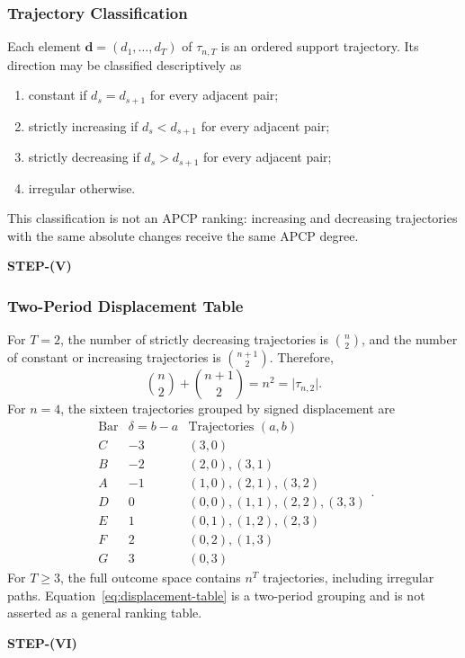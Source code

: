 \documentclass[conference]{IEEEtran}
\theoremstyle{plain}
\theoremstyle{definition}
\theoremstyle{remark}
\begin{document}
	\subsubsection{Trajectory Classification}
	Each element $\mathbf d=(d_1,\ldots,d_T)$ of $\tau_{n,T}$ is an ordered support trajectory. Its direction may be classified descriptively as
	\begin{enumerate}[label=(\roman*)]
		\item constant if $d_s=d_{s+1}$ for every adjacent pair;
		\item strictly increasing if $d_s<d_{s+1}$ for every adjacent pair;
		\item strictly decreasing if $d_s>d_{s+1}$ for every adjacent pair;
		\item irregular otherwise.
	\end{enumerate}
	This classification is not an APCP ranking: increasing and decreasing trajectories with the same absolute changes receive the same APCP degree.
	\begin{center}
		\textbf{STEP-(V)}
	\end{center}
	\subsubsection{Two-Period Displacement Table}
	For $T=2$, the number of strictly decreasing trajectories is $\binom n2$, and the number of constant or increasing trajectories is $\binom{n+1}{2}$. Therefore,
	\begin{equation}
		\binom n2+\binom{n+1}{2}=n^2=\lvert\tau_{n,2}\rvert.
	\end{equation}
	For $n=4$, the sixteen trajectories grouped by signed displacement are
	\begin{equation}\label{eq:displacement-table}
	\begin{array}{c|c|l}
	\text{Bar}&\delta=b-a&\text{Trajectories }(a,b)\\ \hline
	C&-3&(3,0)\\
	B&-2&(2,0),(3,1)\\
	A&-1&(1,0),(2,1),(3,2)\\
	D& 0&(0,0),(1,1),(2,2),(3,3)\\
	E& 1&(0,1),(1,2),(2,3)\\
	F& 2&(0,2),(1,3)\\
	G& 3&(0,3)
	\end{array}.
	\end{equation}
	For $T\geq3$, the full outcome space contains $n^T$ trajectories, including irregular paths. Equation~\eqref{eq:displacement-table} is a two-period grouping and is not asserted as a general ranking table.
	\begin{center}
		\textbf{STEP-(VI)}
	\end{center}
\end{document}
